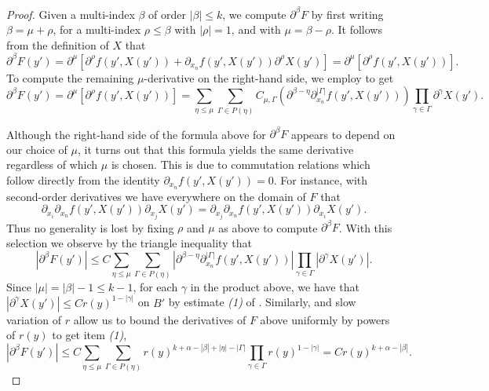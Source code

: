 \documentclass[oneside,hidelinks,indentfirst,10pt]{book}
\begin{document}
\begin{proof}
Given a multi-index \(\beta\) of order \(|\beta|\leq k\), we compute \(\partial^\beta F\) by first writing \(\beta=\mu+\rho\), for a multi-index \(\rho\leq \beta\) with \(|\rho|=1\), and with \(\mu=\beta-\rho\). It follows from the definition of \(X\) that
\[
    \partial^\beta F(y')=\partial^\mu[\partial^\rho f(y',X(y'))+\partial_{x_n}f(y',X(y'))\partial^\rho X(y')]=\partial^\mu[\partial^\rho f(y',X(y'))].
\]
To compute the remaining \(\mu\)-derivative on the right-hand side, we employ  to get
\[
    \partial^\beta F(y')=\partial^\mu[\partial^\rho f(y',X(y'))]=\sum_{\eta\leq\mu }\sum_{\Gamma\in P(\eta)}C_{\mu,\Gamma}(\partial^{\beta-\eta}\partial^{|\Gamma|}_{x_n}f(y',X(y')))\prod_{\gamma\in\Gamma}\partial^\gamma X(y').
\]


Although the right-hand side of the formula above for \(\partial^\beta F\) appears to depend on our choice of \(\mu\), it turns out that this formula yields the same derivative regardless of which \(\mu\) is chosen. This is due to commutation relations which follow directly from the identity \(\partial_{x_n}f(y',X(y'))=0\). For instance, with second-order derivatives we have everywhere on the domain of \(F\) that
\[
    \partial_{x_i}\partial_{x_n}f(y',X(y'))\partial_{x_j}X(y')=\partial_{x_j}\partial_{x_n}f(y',X(y'))\partial_{x_i}X(y').
\]
Thus no generality is lost by fixing \(\rho\) and \(\mu\) as above to compute \(\partial^\beta F\). With this selection we observe by the triangle inequality that
\[
    |\partial^\beta F(y')|\leq C\sum_{\eta\leq\mu }\sum_{\Gamma\in P(\eta)}|\partial^{\beta-\eta}\partial^{|\Gamma|}_{x_n}f(y',X(y'))|\prod_{\gamma\in\Gamma}|\partial^\gamma X(y')|.
\]
Since \(|\mu|=|\beta|-1\leq k-1\), for each \(\gamma\) in the product above, we have that \(|\partial^\gamma X(y')|\leq Cr(y)^{1-|\gamma|}\) on \(B'\) by estimate \textit{(1)} of . Similarly,  and slow variation of \(r\) allow us to bound the derivatives of \(F\) above uniformly by powers of \(r(y)\) to get item \textit{(1)},
\[
    |\partial^\beta F(y')|\leq C\sum_{\eta\leq\mu }\sum_{\Gamma\in P(\eta)}r(y)^{k+\alpha-|\beta|+|\eta|-|\Gamma|}\prod_{\gamma\in\Gamma}r(y)^{1-|\gamma|}=Cr(y)^{k+\alpha-|\beta|}.
\]



\end{proof}
\end{document}
